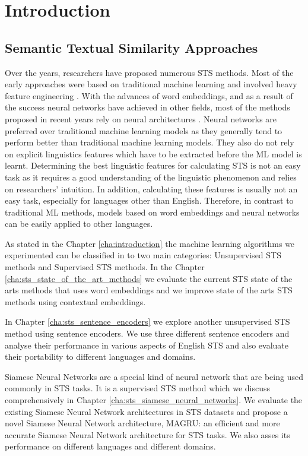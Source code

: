 \chapter{\label{cha:sts_introduction}Introduction}






\section{Semantic Textual Similarity Approaches}
Over the years, researchers have proposed numerous STS methods. Most of the early approaches were based on traditional machine learning and involved heavy feature engineering \cite{bechara-etal-2015-miniexperts}. With the advances of word embeddings, and as a result of the success neural networks have achieved in other fields, most of the methods proposed in recent years rely on neural architectures \cite{tai-etal-2015-improved,shao-2017-hcti}. Neural networks are preferred over traditional machine learning models as they generally tend to perform better than traditional machine learning models. They also do not rely on explicit linguistics features which have to be extracted before the ML model is learnt. Determining the best linguistic features for calculating STS is not an easy task as it requires a good understanding of the linguistic phenomenon and relies on researchers' intuition. In addition, calculating these features is usually not an easy task, especially for languages other than English. Therefore, in contrast to traditional ML methods, models based on word embeddings and neural networks can be easily applied to other languages.

As stated in the  Chapter \ref{cha:introduction} the machine learning algorithms we experimented can be classified in to two main categories: Unsupervised STS methods and Supervised STS methods. In the Chapter \ref{cha:sts_state_of_the_art_methods} we evaluate the current STS state of the arts methods that uses word embeddings and we improve state of the arts STS methods using contextual embeddings.

In Chapter \ref{cha:sts_sentence_encoders} we explore another unsupervised STS method using sentence encoders. We use three different sentence encoders and analyse their performance in various aspects of English STS and also evaluate their portability to different languages and domains.  

Siamese Neural Networks are a special kind of neural network that are being used commonly in STS tasks. It is a supervised STS method which we discuss comprehensively in Chapter \ref{cha:sts_siamese_neural_networks}. We evaluate the existing Siamese Neural Network architectures in STS datasets and propose a novel Siamese Neural Network architecture, MAGRU: an efficient and more accurate Siamese Neural Network architecture for STS tasks. We also asses its performance on different languages and different domains. 

